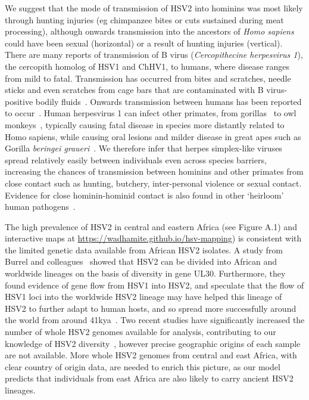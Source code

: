 \documentclass[fleqn,10pt]{wlscirep}
\begin{document}
We suggest that the mode of transmission of HSV2 into hominins was most likely through hunting injuries (eg chimpanzee bites or cuts sustained during meat processing), although onwards transmission into the ancestors of \textit{Homo sapiens} could have been sexual (horizontal) or a result of hunting injuries (vertical). There are many reports of transmission of B virus (\textit{Cercopithecine herpesvirus 1}), the cercopith homolog of HSV1 and ChHV1, to humans, where disease ranges from mild to fatal. Transmission has occurred from bites and scratches, needle sticks and even scratches from cage bars that are contaminated with B virus-positive bodily fluids~\cite{Huff2003}. Onwards transmission between humans has been reported to occur~\cite{CentersforDiseaseControlCDC1987}. Human herpesvirus 1 can infect other primates, from gorillas~\cite{Gilardi2014} to owl monkeys~\cite{Melendez1969}, typically causing fatal disease in species more distantly related to Homo sapiens, while causing oral lesions and milder disease in great apes such as Gorilla \textit{beringei graueri}~\cite{Gilardi2014}. We therefore infer that herpes simplex-like viruses spread relatively easily between individuals even across species barriers, increasing the chances of transmission between hominins and other primates from close contact such as hunting, butchery, inter-personal violence or sexual contact. Evidence for close hominin-hominid contact is also found in other `heirloom' human pathogens~\cite{Houldcroft2017a}.

The high prevalence of HSV2 in central and eastern Africa (see Figure A.1) and interactive maps at \url{https://wadhamite.github.io/hsv-mapping}) is consistent with the limited genetic data available from African HSV2 isolates. A study from Burrel and colleagues~\cite{Burrel2015} showed that HSV2 can be divided into African and worldwide lineages on the basis of diversity in gene UL30. Furthermore, they found evidence of gene flow from HSV1 into HSV2, and speculate that the flow of HSV1 loci into the worldwide HSV2 lineage may have helped this lineage of HSV2 to further adapt to human hosts, and so spread more successfully around the world from around 41kya~\cite{Burrel2017}. Two recent studies have significantly increased the number of whole HSV2 genomes available for analysis, contributing to our knowledge of HSV2 diversity~\cite{Szpara2014,Kolb2015}, however precise geographic origins of each sample are not available. More whole HSV2 genomes from central and east Africa, with clear country of origin data, are needed to enrich this picture, as our model predicts that individuals from east Africa are also likely to carry ancient HSV2 lineages. 
\end{document}

